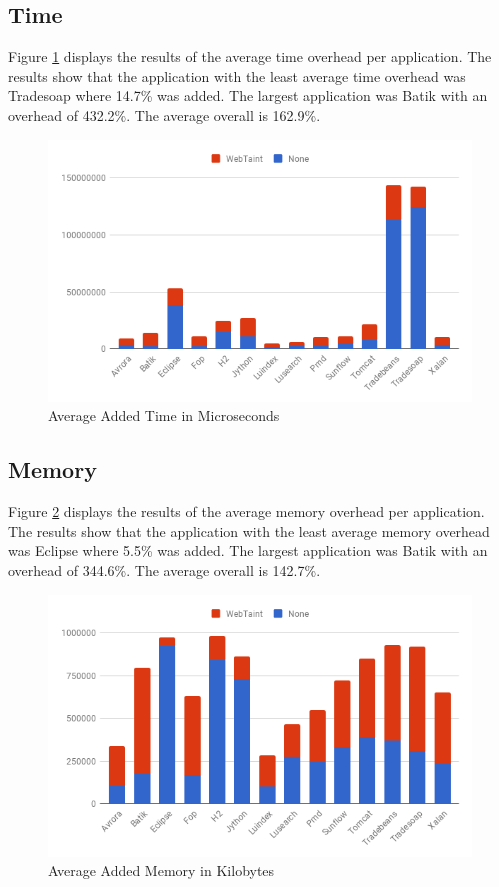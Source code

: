 \subsection{Time}
Figure \ref{fig:Time} displays the results of the average time overhead per application. The results show that the application with the least average time overhead was Tradesoap where 14.7\% was added. The largest application was Batik with an overhead of 432.2\%. The average overall is 162.9\%.

\begin{figure}[H]
    \centering
    \includegraphics[width=\textwidth]{images/Time.png}
    \caption{Average Added Time in Microseconds}
    \label{fig:Time}
\end{figure}



\subsection{Memory}
Figure \ref{fig:Memory} displays the results of the average memory overhead per application. The results show that the application with the least average memory overhead was Eclipse where 5.5\% was added. The largest application was Batik with an overhead of 344.6\%. The average overall is 142.7\%.

\begin{figure}[H]
    \centering
    \includegraphics[width=\textwidth]{images/Memory.png}
    \caption{Average Added Memory in Kilobytes}
    \label{fig:Memory}
\end{figure}